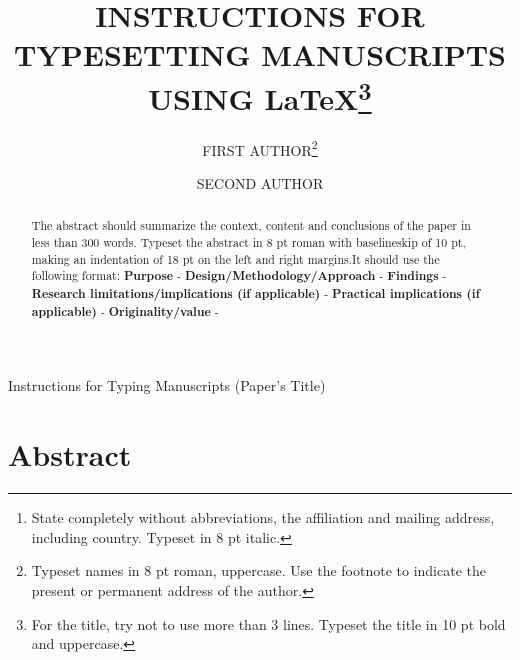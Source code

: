 \documentclass{ijcs_template}
\begin{document}
%
\catchline{}{}{}{}{}
%

{Instructions for Typing Manuscripts (Paper's Title)}

\title{INSTRUCTIONS FOR TYPESETTING MANUSCRIPTS \\
USING \LaTeX\footnote{For the title, try not
to use more than 3 lines. Typeset the title in 10 pt bold and uppercase.}
}

\author{FIRST AUTHOR\footnote{Typeset names in 8 pt roman,
uppercase. Use the footnote to indicate the
present or permanent address of the author.}}

\address{University Department, University Name, Address\\
City, State ZIP/Zone,Country\,\footnote{State completely
without abbreviations, the affiliation and mailing address, including
country. Typeset in 8 pt italic.}\\
  }

\author{SECOND AUTHOR}

\address{Group, Laboratory, Address\\
City, State ZIP/Zone, Country\\
author\_id@domain\_name
}

\maketitle

\begin{history}
\end{history}

\section*{Abstract}
\begin{abstract}
The abstract should summarize the context, content and conclusions
of the paper in less than 300 words. Typeset the abstract in 8 pt
roman with baselineskip of 10 pt, making an indentation of 18 pt on
the left and right margins.It should use the following format:
\newline\textbf{Purpose} - 
\newline\textbf{Design/Methodology/Approach} - 
\newline\textbf{Findings} - 
\newline\textbf{Research limitations/implications (if applicable)} - 
\newline\textbf{Practical implications (if applicable)} - 
\newline\textbf{Originality/value} - 
\end{abstract}
\end{document}
